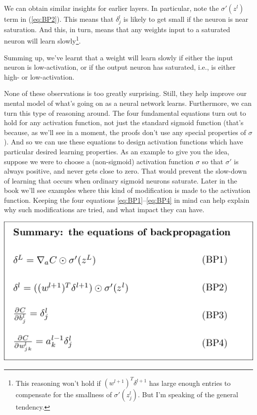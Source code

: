 \documentclass[a4paper,twoside,10pt]{book}
\begin{document}
We can obtain similar insights for earlier layers. In particular, note the $\sigma'(z^l)$ term in (\ref{eq:BP2}). This means that $\delta^l_j$ is likely to get small if the neuron is near saturation. And this, in turn, means that any weights input to a saturated neuron will learn slowly\footnote{This reasoning won't hold if $(w^{l+1})^T\delta^{l+1}$ has large enough entries to compensate for the smallness of $\sigma'(z^l_j)$. But I'm speaking of the general tendency.}.

Summing up, we've learnt that a weight will learn slowly if either the input neuron is low-activation, or if the output neuron has saturated, i.e., is either high- or low-activation.

None of these observations is too greatly surprising. Still, they help improve our mental model of what's going on as a neural network learns. Furthermore, we can turn this type of reasoning around. The four fundamental equations turn out to hold for any activation function, not just the standard sigmoid function (that's because, as we'll see in a moment, the proofs don't use any special properties of $\sigma$). And so we can use these equations to design activation functions which have particular desired learning properties. As an example to give you the idea, suppose we were to choose a (non-sigmoid) activation function $\sigma$ so that $\sigma'$ is always positive, and never gets close to zero. That would prevent the slow-down of learning that occurs when ordinary sigmoid neurons saturate. Later in the book we'll see examples where this kind of modification is made to the activation function. Keeping the four equations \ref{eq:BP1}--\ref{eq:BP4} in mind can help explain why such modifications are tried, and what impact they can have.
\begin{center}
	\includegraphics[width=0.65\linewidth]{figures/ch2/tikz21}
\end{center}
\end{document}
